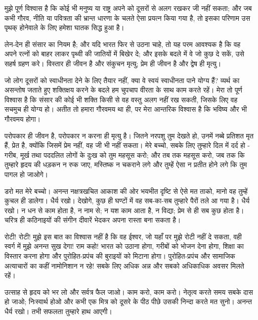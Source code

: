 मुझे पूर्ण विश्वास है कि कोई भी मनुष्य या राष्ट्र अपने को दूसरों से अलग रखकर जी नहीं सकता; और जब कभी गौरव, नीति या पवित्रता की भ्रान्त धारणा के चलते ऐसा प्रयत्न किया गया है, तो इसका परिणाम उस पृथक् होनेवाले के लिए हमेशा घातक सिद्ध हुआ है। 

लेन-देन ही संसार का नियम है; और यदि भारत फिर से उठना चाहे, तो यह परम आवश्यक है कि वह अपने रत्नों को बाहर लाकर पृथ्वी की जातियों में बिखेर दे; और इसके बदले में वे जो कुछ दे सकें, उसे सहर्ष ग्रहण करे। विस्तार ही जीवन है और संकुचन मृत्यु; प्रेम ही जीवन है और द्वेष ही मृत्यु। 

जो लोग दूसरों को स्वाधीनता देने के लिए तैयार नहीं, क्या वे स्वयं स्वाधीनता पाने योग्य हैं? व्यर्थ का असन्तोष जताते हुए शक्तिक्षय करने के बदले हम चुपचाप वीरता के साथ काम करते रहें। मेरा तो पूर्ण विश्वास है कि संसार की कोई भी शक्ति किसी से वह वस्तु अलग नहीं रख सकती, जिसके लिए वह सचमुच ही योग्य हो। अतीत तो हमारा गौरवमय था ही, पर मेरा आन्तरिक विश्वास है कि भविष्य और भी गौरवमय होगा। 

\vskip 2.6pt

परोपकार ही जीवन है, परोपकार न करना ही मृत्यु है। जितने नरपशु तुम देखते हो, उनमें नब्बे प्रतिशत मृत हैं, प्रेत है, क्योंकि जिसमें प्रेम नहीं, वह जी भी नहीं सकता। मेरे बच्चो, सबके लिए तुम्हारे दिल में दर्द हो - गरीब, मूर्ख तथा पददलित लोगों के दुःख को तुम महसूस करो; और तब तक महसूस करो, जब तक कि तुम्हारे हृदय की धड़कन न रुक जाए, मस्तिष्क न चकराने लगे और तुम्हें ऐसा न प्रतीत होने लगे कि तुम पागल हो जाओगे। 

\vskip 2.6pt

डरो मत मेरे बच्चो। अनन्त नक्षत्रखचित आकाश की ओर भयभीत दृष्टि से ऐसे मत ताको, मानो वह तुम्हें कुचल ही डालेगा। धैर्य रखो। देखोगे, कुछ ही घण्टों में वह सब-का-सब तुम्हारे पैरों तले आ गया है। धैर्य रखो। न धन से काम होता है, न नाम से; न यश काम आता है, न विद्या; प्रेम से ही सब कुछ होता है। चरित्र ही कठिनाइयों की संगीन दीवारें भेदकर अपना रास्ता बना सकता है। 

\vskip 2.6pt

रोटी! रोटी! मुझे इस बात का विश्वास नहीं है कि वह ईश्वर, जो यहाँ पर मुझे रोटी नहीं दे सकता, वही स्वर्ग में मुझे अनन्त सुख देगा! राम कहो! भारत को उठाना होगा, गरीबों को भोजन देना होगा, शिक्षा का विस्तार करना होगा और पुरोहित-प्रपंच की बुराइयों को मिटाना होगा। पुरोहित-प्रपंच और सामाजिक अत्याचारों का कहीं नामोनिशान न रहे! सबके लिए अधिक अन्न और सबको अधिकाधिक अवसर मिलते रहें। 

\vskip 2.6pt

उत्साह से हृदय को भर लो और सर्वत्र फैल जाओ। काम करो, काम करो। नेतृत्व करते समय सबके दास हो जाओ; निःस्वार्थ होओ और कभी एक मित्र को दूसरे के पीठ पीछे उसकी निन्दा करते मत सुनो। अनन्त धैर्य रखो। तभी सफलता तुम्हारे हाथ आएगी। 

